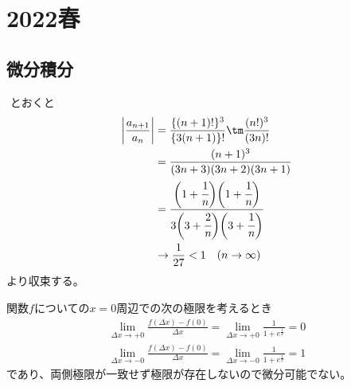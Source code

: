 \newpage
\section{2022春}

\setcounter{yearcounter}{2022}


\subsection{微分積分}
\begin{ans*}
  ${}$
  とおくと
  \begin{align}
    \left| \frac{a_{n+1}}{a_{n}} \right|
    &= \frac{\{(n+1)!\}^3}{\{3(n+1)\}!} \tm \frac{(n!)^3}{(3n)!} \\
    &= \frac{(n+1)^3}{(3n+3)(3n+2)(3n+1)} \\
    &= \frac{\biggl(1+\cfrac{1}{n}\biggr)\biggl(1+\cfrac{1}{n}\biggr)}
    {3\biggl(3+\cfrac{2}{n}\biggr)\biggl(3+\cfrac{1}{n}\biggr)} \\
    &\to \frac{1}{27} < 1 \quad(n\to\infty)
  \end{align}
  より収束する。
\end{ans*}



\begin{ans*}
  関数$f$についての$x=0$周辺での次の極限を考えるとき
  \begin{align}
    \lim_{\Delta x\to +0}\frac{f(\Delta x) - f(0)}{\Delta x} 
    = \lim_{\Delta x\to +0}\frac{1}{1+e^{\frac{1}{x}}} 
    = 0 \\
    \lim_{\Delta x\to -0}\frac{f(\Delta x) - f(0)}{\Delta x} 
    = \lim_{\Delta x\to -0}\frac{1}{1+e^{\frac{1}{x}}} 
    = 1
  \end{align}
  であり、両側極限が一致せず極限が存在しないので微分可能でない。
\end{ans*}


